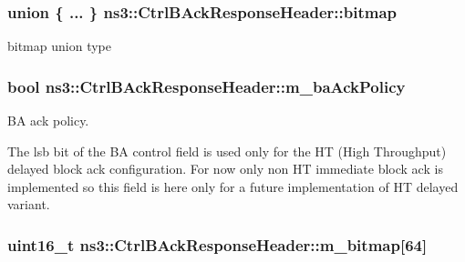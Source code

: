 \subsubsection[{\texorpdfstring{bitmap}{bitmap}}]{\setlength{\rightskip}{0pt plus 5cm}union \{ ... \}   ns3\+::\+Ctrl\+B\+Ack\+Response\+Header\+::bitmap\hspace{0.3cm}{\ttfamily [private]}}\hypertarget{classns3_1_1CtrlBAckResponseHeader_a08f2ce2e8665317a7d381e498cc75453}{}\label{classns3_1_1CtrlBAckResponseHeader_a08f2ce2e8665317a7d381e498cc75453}


bitmap union type 

\subsubsection[{\texorpdfstring{m\+\_\+ba\+Ack\+Policy}{m_baAckPolicy}}]{\setlength{\rightskip}{0pt plus 5cm}bool ns3\+::\+Ctrl\+B\+Ack\+Response\+Header\+::m\+\_\+ba\+Ack\+Policy\hspace{0.3cm}{\ttfamily [private]}}\hypertarget{classns3_1_1CtrlBAckResponseHeader_a73e1825f961271ed0d746644cf12e3cf}{}\label{classns3_1_1CtrlBAckResponseHeader_a73e1825f961271ed0d746644cf12e3cf}


BA ack policy. 

The lsb bit of the BA control field is used only for the HT (High Throughput) delayed block ack configuration. For now only non HT immediate block ack is implemented so this field is here only for a future implementation of HT delayed variant. 
\subsubsection[{\texorpdfstring{m\+\_\+bitmap}{m_bitmap}}]{\setlength{\rightskip}{0pt plus 5cm}uint16\+\_\+t ns3\+::\+Ctrl\+B\+Ack\+Response\+Header\+::m\+\_\+bitmap\mbox{[}64\mbox{]}}\hypertarget{classns3_1_1CtrlBAckResponseHeader_a988f3ebcf246f3a4f651659bbbb4bbb5}{}\label{classns3_1_1CtrlBAckResponseHeader_a988f3ebcf246f3a4f651659bbbb4bbb5}
